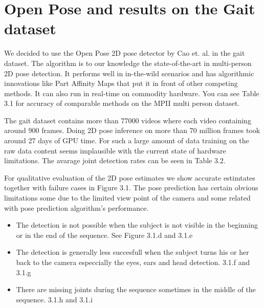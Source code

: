 \section{Open Pose and results on the Gait dataset}

We decided to use the Open Pose 2D pose detector by Cao et. al. \parencite{cao2016realtime} in the gait dataset. The algorithm is to our knowledge the state-of-the-art in multi-person 2D pose detection. It performs well in in-the-wild scenarios and has algorithmic innovations like Part Affinity Maps that put it in front of other competing methods. It can also run in real-time on commodity hardware. You can see Table 3.1 for accuracy of comparable methods on the MPII multi person dataset.

The gait dataset contains more than 77000 videos where each video containing around 900 frames. Doing 2D pose inference on more than 70 million frames took around 27 days of GPU time. For such a large amount of data training on the raw data content seems implausible with the current state of hardware limitations. The avarage joint detection rates can be seen in Table 3.2.

For qualitative evaluation of the 2D pose estimates we show accurate estimtates together with failure cases in Figure 3.1. The pose prediction has certain obvious limitations some due to the limited view point of the camera and some related with pose prediction algorithm's performance. 

\begin{itemize}
    \item The detection is not possible when the subject is not visible in the beginning or in the end of the sequence. See Figure 3.1.d and 3.1.e
    \item The detection is generally less succesfull  when the subject turns his or her back to the camera especcially the eyes, ears and head detection. 3.1.f and 3.1.g
    \item There are missing joints during the sequence sometimes in the middle of the sequence. 3.1.h and 3.1.i
\end{itemize}
